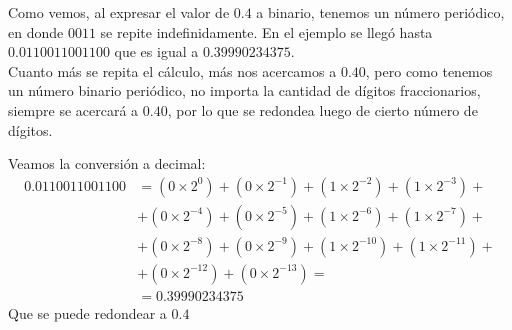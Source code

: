 \begin{frame}
Como vemos, al expresar el valor de $0.4$ a binario, tenemos un número periódico, en donde $0011$ se repite indefinidamente. En el ejemplo se llegó hasta $0.0110011001100$ que es igual a $0.39990234375$.
\\
\bigskip
Cuanto más se repita el cálculo, más nos acercamos a $0.40$, pero como tenemos un número binario periódico, no importa la cantidad de dígitos fraccionarios, siempre se acercará a $0.40$, por lo que se redondea luego de cierto número de dígitos.
\end{frame}
\begin{frame}
Veamos la conversión a decimal:
\fontsize{11}{11}\selectfont
\[ \begin{split}
0.0110011001100 &= (0 \times 2^{0}) + (0 \times 2^{-1}) + (1 \times 2^{-2}) + (1 \times 2^{-3}) + \\
{} &+ (0 \times 2^{-4}) + (0 \times 2^{-5})+ (1 \times 2^{-6}) + (1 \times 2^{-7}) + \\
{} &+ (0 \times 2^{-8}) + (0 \times 2^{-9}) + (1 \times 2^{-10}) + (1 \times 2^{-11}) + \\
{} &+ (0 \times 2^{-12})+ (0 \times 2^{-13}) = \\
{} &= 0.39990234375 
\end{split} \]
Que se puede redondear a $0.4$
\end{frame}
